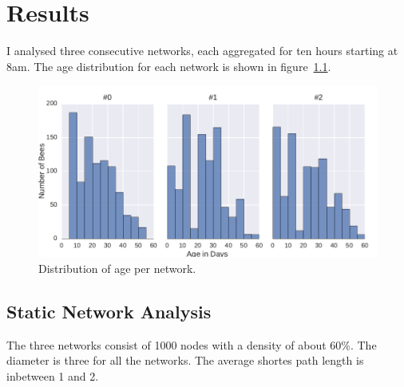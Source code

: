 \chapter{Results}

I analysed three consecutive networks, each aggregated for ten hours starting at 8am. The age distribution for each network is shown in figure~\ref{fig:ages}.

\begin{figure}[htb]
	\centering
	\includegraphics[width=1.0\textwidth]{Figures/ages}
	\caption[Distribution of gge per Network]{Distribution of age per network.}
	\label{fig:ages}
\end{figure}


\section{Static Network Analysis}

The three networks consist of 1000 nodes with a density of about 60\%. The diameter is three for all the networks. The average shortes path length is inbetween 1 and 2. 

